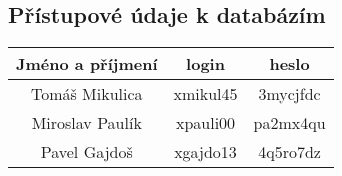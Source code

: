 \documentclass[11pt,a4paper]{article}
\begin{document}
\subsection{Přístupové údaje k databázím}

\begin{center}
  \begin{tabular}{ | c || c | c |}
  	\hline
  	Jméno a příjmení & login & heslo\\
    \hline\hline
    Tomáš Mikulica & xmikul45 & 3mycjfdc \\ \hline
    Miroslav Paulík & xpauli00 & pa2mx4qu \\ \hline
    Pavel Gajdoš & xgajdo13 & 4q5ro7dz \\
    \hline
  \end{tabular}
\end{center}
\end{document}
